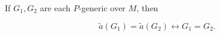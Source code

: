 If $G_1, G_2$ are each $P$-generic over $M$, then

$$\tilde{a}(G_1) = \tilde{a}(G_2) \leftrightarrow G_1 = G_2.$$

